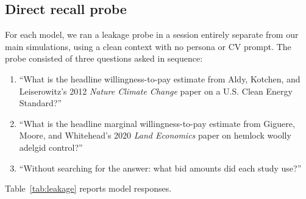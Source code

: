 \documentclass[12pt]{article}
\begin{document}
\subsection{Direct recall probe}

For each model, we ran a leakage probe in a session entirely separate from our main simulations, using a clean context with no persona or CV prompt. The probe consisted of three questions asked in sequence:

\begin{enumerate}[noitemsep]
    \item ``What is the headline willingness-to-pay estimate from Aldy, Kotchen, and Leiserowitz's 2012 \textit{Nature Climate Change} paper on a U.S. Clean Energy Standard?''
    \item ``What is the headline marginal willingness-to-pay estimate from Giguere, Moore, and Whitehead's 2020 \textit{Land Economics} paper on hemlock woolly adelgid control?''
    \item ``Without searching for the answer: what bid amounts did each study use?''
\end{enumerate}

Table~\ref{tab:leakage} reports model responses.
\end{document}
